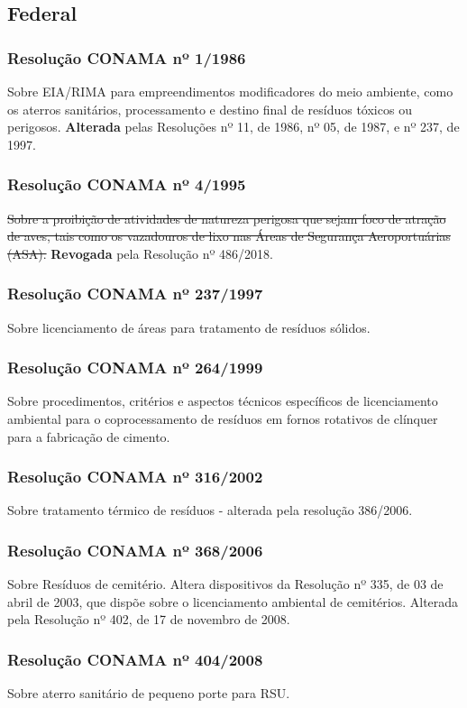 \begin{subapend}
	\subsection{Federal}
	\begin{subsubapend}
		\item \subsubsection{Resolução CONAMA nº 1/1986}
		Sobre EIA/RIMA para empreendimentos modificadores do meio ambiente, como os aterros sanitários, processamento e destino final de resíduos tóxicos ou perigosos. \textbf{Alterada} pelas Resoluções nº 11, de 1986, nº 05, de 1987, e nº 237, de 1997.
		\subsubsection{Resolução CONAMA nº 4/1995}
		\sout{Sobre a proibição de atividades de natureza perigosa que sejam foco de atração de aves, tais como os vazadouros de lixo nas Áreas de Segurança Aeroportuárias (ASA).} \textbf{Revogada} pela Resolução nº 486/2018.
		\subsubsection{Resolução CONAMA nº 237/1997}
		Sobre licenciamento de áreas para tratamento de resíduos sólidos.
		\subsubsection{Resolução CONAMA nº 264/1999}
		Sobre procedimentos, critérios e aspectos técnicos específicos de licenciamento ambiental para o coprocessamento de resíduos em fornos rotativos de clínquer para a fabricação de cimento.
		\subsubsection{Resolução CONAMA nº 316/2002}
		Sobre tratamento térmico de resíduos - alterada pela resolução 386/2006.
		\subsubsection{Resolução CONAMA nº 368/2006}
		Sobre Resíduos de cemitério. Altera dispositivos da Resolução nº 335, de 03 de abril de 2003, que dispõe sobre o licenciamento ambiental de cemitérios. Alterada pela Resolução nº 402, de 17 de novembro de 2008.
		\subsubsection{Resolução CONAMA nº 404/2008}
		Sobre aterro sanitário de pequeno porte para RSU.

\end{subsubapend}
\end{subapend}
